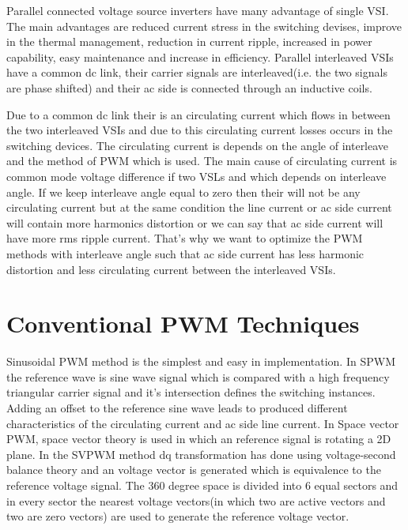 \documentclass[conference]{IEEEtran}
\begin{document}
Parallel connected voltage source inverters have many advantage of single VSI. The main  advantages are reduced current stress in the switching devises, improve in the thermal management, reduction in current ripple, increased in power capability, easy maintenance and increase in efficiency. Parallel interleaved VSIs have a common dc link, their carrier signals are interleaved(i.e. the two signals are phase shifted) and their ac side is connected through an inductive coils.

Due to a common dc link their is an circulating current which flows in between the two interleaved VSIs and due to this circulating current losses occurs in the switching devices. The circulating current is depends on the angle of interleave and the method of PWM which is used. The main cause of circulating current is common mode voltage difference if two VSLs and which depends on interleave angle. If we keep interleave angle equal to zero then their will not be any circulating current but at the same condition the line current or ac side current will contain more harmonics distortion or we can say that ac side current will have more rms ripple current. That's why we want to optimize the PWM methods with interleave angle such that ac side current has less harmonic distortion and less circulating current between the interleaved VSIs.


\section{Conventional PWM Techniques}
 Sinusoidal PWM method is the simplest and easy in implementation. In SPWM the reference wave is sine wave signal which is compared with a high frequency triangular carrier signal and it's intersection defines the switching instances. Adding an offset to the reference sine wave leads to produced different characteristics of the circulating current and ac side line current. In Space vector PWM, space vector theory is used in which an reference signal is rotating a 2D plane.
 In the SVPWM method dq transformation has done using voltage-second balance theory and an voltage vector is generated which is equivalence to the reference voltage signal. The 360 degree space is divided into 6 equal sectors and in every sector the nearest voltage vectors(in which two are active vectors and two are zero vectors) are used to generate the reference voltage vector. 
 
\end{document}
